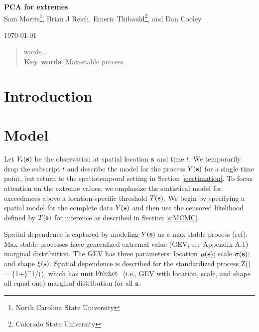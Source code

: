 \documentclass[11pt]{article}
\begin{document}
\linenumbers
\pagestyle{empty}
\begin{center}
{\Large {\bf PCA for extremes}}\\

{\large Sam Morris\footnote[1]{North Carolina State University}, Brian J Reich\footnotemark[1]{}, Emeric Thibauld\footnote[2]{Colorado State University}, and Dan Cooley\footnotemark[2]{}}

\today
\end{center}


\begin{abstract}
	words...\\
	{\bf Key words}: Max-stable process.

\end{abstract}
\newpage
\pagestyle{plain}
\setcounter{page}{1}

\section{Introduction}\label{s:intro}

\section{Model}\label{s:model}

Let $Y_{t}(\mbox{\bf s})$ be the observation at spatial location $\mbox{\bf s}$ and time $t$.  We temporarily drop the subscript $t$ and describe the model for the process $Y(\mbox{\bf s})$ for a single time point, but return to the spatiotemporal setting in Section \ref{s:estimation}.  To focus attention on the extreme values, we emphasize the statistical model for exceedances above a location-specific threshold $T(\mbox{\bf s})$.  We begin by specifying a spatial model for the complete data $Y(\mbox{\bf s})$ and then use the censored likelihood defined by $T(\mbox{\bf s})$ for inference as described in Section \ref{s:MCMC}.


Spatial dependence is captured by modeling $Y(\mbox{\bf s})$ as a max-stable process (ref). Max-stable processes have generalized extremal value (GEV; see Appendix A.1) marginal distribution.  The GEV has three parameters: location $\mu(\mbox{\bf s})$; scale $\sigma(\mbox{\bf s})$; and shape $\xi(\mbox{\bf s})$. Spatial dependence is described for the standardized process
\beq\label{Y2Z}
 Z(\bs) = \left\{1+\frac{\xi(\bs)}{\sigma(\bs)}\left[Y(\bs) - \mu(\bs)\right]\right\}^{1/\xi(\bs)},
\eeq which has unit $\mbox{Fr$\acute{\mbox{e}}$chet }$ (i.e., GEV with location, scale, and shape all equal one) marginal distribution for all $\mbox{\bf s}$.
\end{document}
